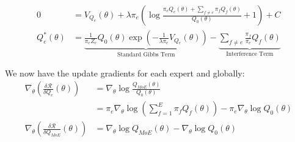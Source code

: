 \documentclass[mstat,12pt]{unswthesis}
\begin{document}
\begin{align*}
    0             & = V_{Q_e}(\theta) + \lambda \pi_e \left( \log \frac{\pi_e Q_e(\theta) + \sum_{f \neq e} \pi_f Q_f(\theta)}{Q_0(\theta)} + 1 \right) + C                                                                                            \\
    Q_e^*(\theta) & = \underbrace{\frac{1}{\pi_e Z_e} Q_0(\theta) \exp \left( -\frac{1}{\lambda \pi_e} V_{Q_e}(\theta) \right)}_{\text{Standard Gibbs Term}} - \underbrace{\sum_{f \neq e} \frac{\pi_f}{\pi_e} Q_f(\theta)}_{\text{Interference Term}}
\end{align*}

We now have the update gradients for each expert and globally:
\begin{align}
    \nabla_\theta \left( \frac{\delta \mathcal{R}}{\delta Q_e}(\theta) \right)     & = \nabla_\theta \log \frac{Q_{MoE}(\theta)}{Q_0(\theta)} \nonumber                                              \\
                                                                                   & = \pi_e \nabla_\theta \log \left( \sum_{f=1}^E \pi_f Q_f(\theta) \right) - \pi_e \nabla_\theta \log Q_0(\theta) \\
    \nabla_\theta \left( \frac{\delta \mathcal{R}}{\delta Q_{MoE}}(\theta) \right) & = \nabla_\theta \log Q_{MoE}(\theta) - \nabla_\theta \log Q_0(\theta)
\end{align}


\clearpage
{}


\end{document}
